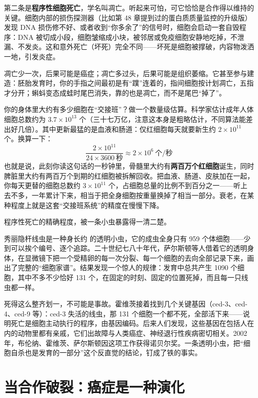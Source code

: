 第二条是\textbf{程序性细胞死亡}，学名叫凋亡。听起来可怕，可它恰恰是合作得以维持的关键。细胞内部的损伤探测器（比如第 48 章提到过的蛋白质质量监控的升级版）发现 DNA 损伤修不好、或者收到“你多余了”的信号时，细胞会启动一套自毁程序：DNA 被切成小段，细胞皱缩成小块，被邻居或免疫细胞安静地吃掉，不泄漏、不发炎。这和意外死亡（坏死）完全不同——坏死是细胞被撑破，内容物泼洒一地，引发炎症。

凋亡少一次，后果可能是癌症；凋亡多过头，后果可能是组织萎缩。它甚至参与建造：胚胎发育时，你的手指之间最初是有“蹼”连着的，指间细胞按计划凋亡，五指才分开；蝌蚪变态成蛙时尾巴消失，靠的也是凋亡，而不是尾巴“掉了”。

\begin{qiaoliang}
你的身体里大约有多少细胞在“交接班”？做一个数量级估算。科学家估计成年人体细胞总数约为 $3.7\times 10^{13}$ 个（三十七万亿，注意这本身是粗略估计，不同算法能差出好几倍）。其中更新最猛的是血液和肠道：仅红细胞每天就要新生约 $2\times 10^{11}$ 个。换算一下：
\[
\frac{2\times 10^{11}}{24\times 3600\ \text{秒}} \approx 2\times 10^{6}\ \text{个/秒}
\]
也就是说，此刻你读这句话的一秒钟里，骨髓里大约有\textbf{两百万个红细胞}诞生，同时脾脏里大约有两百万个到期的红细胞被拆解回收。把血液、肠道、皮肤加在一起，你每天更替的细胞总数约 $3\times 10^{11}$ 个，占细胞总量的比例不到百分之一——听上去不多，一年累计下来，相当于把全身细胞按重量换掉了相当一部分。衰老，在某种程度上就是这套“交接班系统”的精度在慢慢下降。
\end{qiaoliang}

程序性死亡的精确程度，被一条小虫暴露得一清二楚。

\begin{zhengju}
秀丽隐杆线虫是一种身长约  的透明小虫，它的成虫全身只有 959 个体细胞——少到可以挨个编号、逐个追踪。二十世纪七八十年代，萨尔斯顿等人借着它的透明身体，在显微镜下把一个受精卵的每一次分裂、每一个细胞的去向全部记录下来，画出了完整的“细胞家谱”。结果发现一个惊人的规律：发育中总共产生 1090 个细胞，其中不多不少恰好 131 个，在固定的时刻、固定的位置死掉，而且每一只线虫都一样。

死得这么整齐划一，不可能是事故。霍维茨接着找到几个关键基因（ced-3、ced-4、ced-9 等）：ced-3 失活的线虫，那 131 个细胞一个都不死，全部活下来——说明死亡是细胞主动执行的程序，由基因编码。后来人们发现，这些基因在包括人在内的动物里都有亲戚，它们出故障与人类癌症、神经退行性疾病密切相关。2002 年，布伦纳、霍维茨、萨尔斯顿因这项工作获得诺贝尔奖。一条透明小虫，把“细胞自杀也是发育的一部分”这个反直觉的结论，钉成了铁的事实。
\end{zhengju}

\section{当合作破裂：癌症是一种演化}

